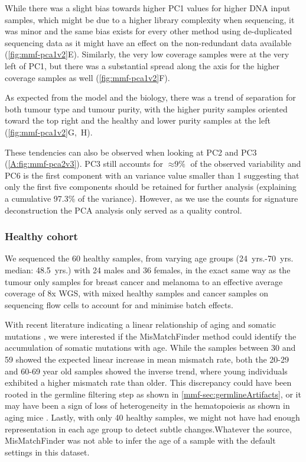 While there was a slight bias towards higher PC1 values for higher DNA input samples, which might be due to a higher library complexity when sequencing, it was minor and the same bias exists for every other method using de-duplicated sequencing data as it might have an effect on the non-redundant data available (\autoref{fig:mmf-pca1v2}E). Similarly, the very low coverage samples were at the very left of PC1, but there was a substantial spread along the axis for the higher coverage samples as well (\autoref{fig:mmf-pca1v2}F). 

As expected from the model and the biology, there was a trend of separation for both tumour type and tumour purity, with the higher purity samples oriented toward the top right and the healthy and lower purity samples at the left (\autoref{fig:mmf-pca1v2}G,~H).

These tendencies can also be observed when looking at PC2 and PC3 (\autoref{A:fig:mmf-pca2v3}). PC3 still accounts for $\approx \text{9\%}$ of the observed variability and PC6 is the first component with an variance value smaller than 1 suggesting that only the first five components should be retained for further analysis (explaining a cumulative 97.3\% of the variance). However, as we use the counts for signature deconstruction the PCA analysis only served as a quality control.


\subsubsection{Healthy cohort}
\label{mmf-sec:healthy}

We sequenced the 60 healthy samples, from varying age groups (\num{24}~yrs.-\num{70}~yrs. median: \num{48.5}~yrs.) with 24 males and 36 females, in the exact same way as the tumour only samples for breast cancer and melanoma to an effective average coverage of 8x WGS, with mixed healthy samples and cancer samples on sequencing flow cells to account for and minimise batch effects.

With recent literature indicating a linear relationship of aging and somatic mutations \cite{Martincorena2018,Abascal2021,Cagan2022}, we were interested if the MisMatchFinder method could identify the accumulation of  somatic mutations with age. While the samples between 30 and 59 showed the expected linear increase in mean mismatch rate, both the 20-29 and 60-69 year old samples showed the inverse trend, where young individuals exhibited a higher mismatch rate than older. This discrepancy could have been rooted in the germline filtering step as shown in \autoref{mmf-sec:germlineArtifacts}, or it may have been a sign of loss of heterogeneity in the hematopoiesis as shown in aging mice \cite{Ganuza2019}. Lastly, with only 40 healthy samples, we might not have had enough representation in each age group to detect subtle changes.Whatever the source, MisMatchFinder was not able to infer the age of a sample with the default settings in this dataset.

